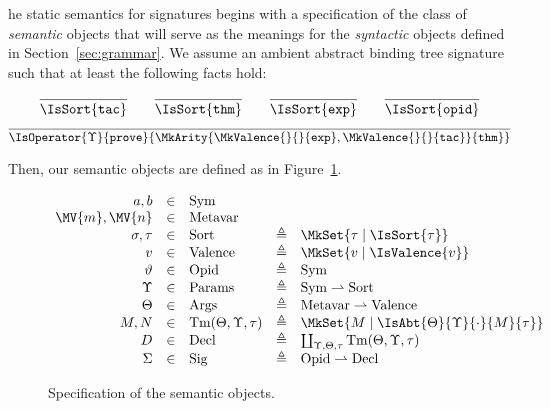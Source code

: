 \documentclass{article}
\begin{document}
\newcommand\SemSym{\mathrm{Sym}}
\newcommand\SemMetavar{\mathrm{Metavar}}
\newcommand\SemOpid{\mathrm{Opid}}
\newcommand\SemSig{\mathrm{Sig}}
\newcommand\SemParams{\mathrm{Params}}
\newcommand\SemArgs{\mathrm{Args}}
\newcommand\SemTerm[3]{\mathrm{Tm}(#1,#2,#3)}
\newcommand\SemSort{\mathrm{Sort}}
\newcommand\SemValence{\mathrm{Valence}}
\newcommand\SemDecl{\mathrm{Decl}}
\newcommand\Partial[2]{#1\rightharpoonup #2}

\newcommand\SemExprs{\mathbf{E}}
\newcommand\AbtSortTac{\mathtt{tac}}
\newcommand\AbtSortThm{\mathtt{thm}}
\newcommand\AbtSortExp{\mathtt{exp}}
\newcommand\AbtSortOpid{\mathtt{opid}}
\newcommand\OpProve{\mathtt{prove}}

\newcommand\OpCust

The static semantics for \RedJonPRL{} signatures begins with a specification of
the class of \emph{semantic} objects that will serve as the meanings for the
\emph{syntactic} objects defined in Section~\ref{sec:grammar}. We assume an
ambient abstract binding tree signature such that at least the following facts
hold:

\[
  \infer{
    \IsSort{\AbtSortTac}
  }{
  }
  \qquad
  \infer{
    \IsSort{\AbtSortThm}
  }{
  }
  \qquad
  \infer{
    \IsSort{\AbtSortExp}
  }{
  }
  \qquad
  \infer{
    \IsSort{\AbtSortOpid}
  }{
  }
\]
\[
  \infer{
    \IsOperator{\Upsilon}{\OpProve}{
      \MkArity{
        \MkValence{}{}{\AbtSortExp},
        \MkValence{}{}{\AbtSortTac}
      }{\AbtSortThm}
    }
  }{
  }
\]

Then, our semantic objects are defined as in Figure~\ref{fig:semantic-objects}.

\begin{figure}[H]
  \begin{displaymath}
    \begin{array}{rclcl}
      a,b &\in &\SemSym\\
      \MV{m},\MV{n} &\in &\SemMetavar\\
      \sigma,\tau &\in &\SemSort &\triangleq & \MkSet{\tau\mid\IsSort{\tau}}\\
      v &\in &\SemValence &\triangleq & \MkSet{v\mid\IsValence{v}}\\
      \vartheta &\in &\SemOpid  &\triangleq &\SemSym\\
      \Upsilon &\in &\SemParams &\triangleq & \Partial{\SemSym}{\SemSort}\\
      \Theta &\in &\SemArgs &\triangleq & \Partial{\SemMetavar}{\SemValence}\\
      M,N &\in &\SemTerm{\Theta}{\Upsilon}{\tau} &\triangleq & \MkSet{M\mid\IsAbt{\Theta}{\Upsilon}{\cdot}{M}{\tau}}\\
      D &\in &\SemDecl &\triangleq & \coprod_{\Upsilon,\Theta,\tau} \SemTerm{\Theta}{\Upsilon}{\tau}\\
      \Sigma &\in &\SemSig &\triangleq & \Partial{\SemOpid}{\SemDecl}
    \end{array}
  \end{displaymath}
  \caption{Specification of the semantic objects.}
  \label{fig:semantic-objects}
\end{figure}
\end{document}
